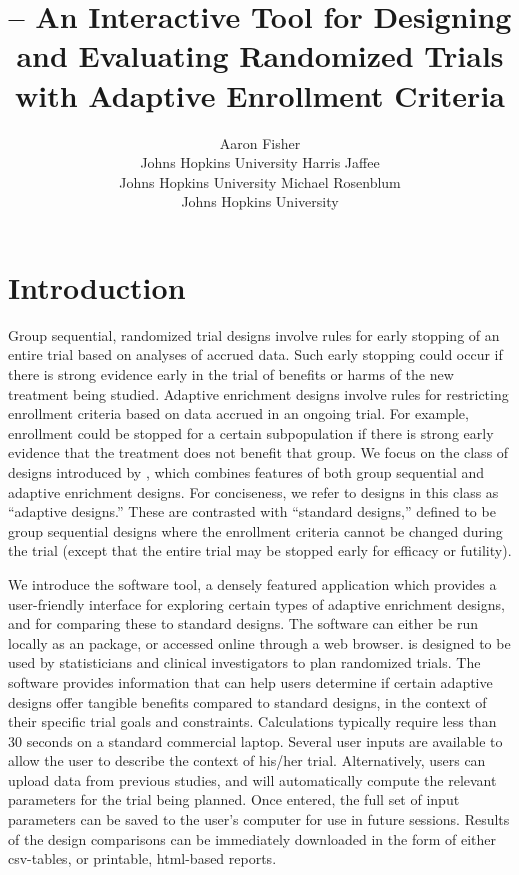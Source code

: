 \documentclass[article]{jss}
\title{\pkg{interAdapt} – An Interactive Tool for Designing and Evaluating Randomized Trials with Adaptive Enrollment Criteria}
\date{}
\author{Aaron Fisher \\Johns Hopkins University \And Harris Jaffee \\Johns Hopkins University \And Michael Rosenblum\\Johns Hopkins University}
\begin{document}
\maketitle








\section*{Introduction} \label{sec:intro}
Group sequential, randomized trial designs involve rules for early stopping of an entire trial based on analyses of accrued data. Such early stopping could occur if there is strong evidence early in the trial of benefits or harms of the new treatment being studied. Adaptive enrichment designs involve rules for restricting enrollment criteria based on data accrued in an ongoing trial. For example, enrollment could be stopped for a certain subpopulation if there is strong early evidence that the treatment does not benefit that group.
We focus on the  class of designs introduced by \cite{Rosenblum2013AdaptMISTIE}, which combines features of both group sequential and adaptive enrichment designs. For conciseness, we refer to designs in this class as  ``adaptive designs.''
These are contrasted with ``standard designs,'' 
defined to  be group sequential designs where the enrollment criteria cannot be changed during the trial (except that the entire trial may be stopped early for efficacy or futility). 

We introduce the  software tool, a densely featured  application which provides a user-friendly interface for exploring certain types of adaptive enrichment designs, and for comparing these to standard designs. %
The software can either be run locally as an  package, or accessed online through a web browser. 
 is designed to be used by statisticians and clinical investigators to plan randomized trials. The software provides information that can help users determine if certain adaptive designs offer tangible benefits compared to standard designs, in the context of their specific trial goals and constraints. Calculations typically require less than 30 seconds on a standard commercial laptop. Several user inputs are available to allow the user to describe the context of his/her trial. Alternatively, users can upload data from previous studies, and  will automatically compute the relevant parameters for the trial being planned. Once entered, the full set of input parameters can be saved to the user's computer for use in future sessions. Results of the design comparisons can be immediately downloaded in the form of either csv-tables, or printable, html-based reports.
\end{document}
